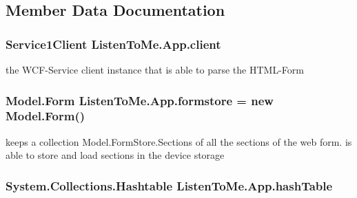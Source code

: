 \subsection{Member Data Documentation}
\subsubsection[{\texorpdfstring{client}{client}}]{\setlength{\rightskip}{0pt plus 5cm}Service1\+Client Listen\+To\+Me.\+App.\+client\hspace{0.3cm}{\ttfamily [static]}}\hypertarget{class_listen_to_me_1_1_app_a41b762ac78fada5d35954d39419b8e36}{}\label{class_listen_to_me_1_1_app_a41b762ac78fada5d35954d39419b8e36}


the W\+C\+F-\/\+Service client instance that is able to parse the H\+T\+M\+L-\/\+Form 

\subsubsection[{\texorpdfstring{formstore}{formstore}}]{\setlength{\rightskip}{0pt plus 5cm}Model.\+Form Listen\+To\+Me.\+App.\+formstore = new Model.\+Form()\hspace{0.3cm}{\ttfamily [static]}}\hypertarget{class_listen_to_me_1_1_app_a3e094e220103fe4590cf50c22f38ee65}{}\label{class_listen_to_me_1_1_app_a3e094e220103fe4590cf50c22f38ee65}


keeps a collection Model.\+Form\+Store.\+Sections of all the sections of the web form. is able to store and load sections in the device storage 

\subsubsection[{\texorpdfstring{hash\+Table}{hashTable}}]{\setlength{\rightskip}{0pt plus 5cm}System.\+Collections.\+Hashtable Listen\+To\+Me.\+App.\+hash\+Table\hspace{0.3cm}{\ttfamily [static]}}\hypertarget{class_listen_to_me_1_1_app_a311ccaa1ae0fd9cf9f89d3e3466098fe}{}\label{class_listen_to_me_1_1_app_a311ccaa1ae0fd9cf9f89d3e3466098fe}


